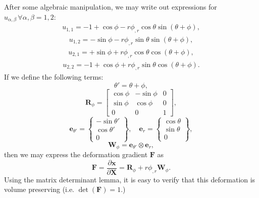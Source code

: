 \documentclass[12pt]{article}
\begin{document}
After some algebraic manipulation, we may write out expressions for $u_{\alpha,\beta} \, \forall \alpha, \beta = 1, 2$:
\begin{eqnarray}
	u_{1,1} = - 1 + \cos \phi - r \phi_{,r} \cos \theta \sin (\theta + \phi),
\end{eqnarray}
\begin{eqnarray}
	u_{1,2} = - \sin \phi - r \phi_{,r} \sin \theta \sin (\theta + \phi),
\end{eqnarray}
\begin{eqnarray}
	u_{2,1} = + \sin \phi + r \phi_{,r} \cos \theta \cos (\theta + \phi),
\end{eqnarray}
\begin{eqnarray}
	u_{2,2} = - 1 + \cos \phi + r \phi_{,r} \sin \theta \cos (\theta + \phi).
\end{eqnarray}
If we define the following terms:
\begin{equation}
	\theta' = \theta + \phi,
\end{equation}
\begin{equation}
	\mathbf{R}_\phi = \left[ \begin{array}{ccc} 
	\cos \phi & - \sin \phi & 0 \\ 
	\sin \phi & \cos \phi & 0 \\ 0 & 0 & 1 \end{array} \right],
\end{equation}
\begin{equation}
	\mathbf{e}_{\theta'} = \left\{ \begin{array}{c} 
	- \sin \theta' \\ \cos \theta' \\ 0 \end{array} \right\}, \quad
	\mathbf{e}_r = \left\{ \begin{array}{c} 
	\cos \theta \\ \sin \theta \\ 0 \end{array} \right\},
\end{equation}
\begin{equation}
	\mathbf{W}_\phi = \mathbf{e}_{\theta'} \otimes \mathbf{e}_r ,
\end{equation}
then we may express the deformation gradient $\mathbf{F}$ as
\begin{equation}
	\mathbf{F} = \frac{\partial \mathbf{x}}{\partial \mathbf{X}} = \mathbf{R}_\phi + r \phi_{,r} \mathbf{W}_\phi.
\end{equation}
Using the matrix determinant lemma, it is easy to verify that this deformation is volume preserving (i.e. $\det (\mathbf{F}) = 1$.)
\end{document}
